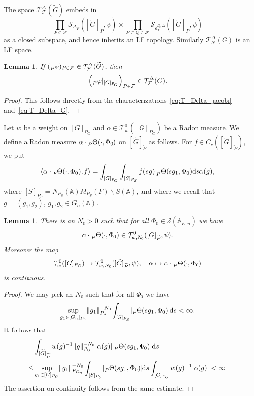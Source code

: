 \documentclass[letterpaper,11pt]{amsart}
\newcommand{\bA}{\mathbb{A}}
\newcommand{\cF}{\mathcal{F}}
\newcommand{\cS}{\mathcal{S}}
\newcommand{\cT}{\mathcal{T}}
\newcommand{\rd}{\mathrm{d}}
\newcommand{\<}{\negthickspace}
\providecommand{\abs}[1]{\lvert#1\rvert}
\providecommand{\aabs}[1]{\lVert#1\rVert}
\theoremstyle{definition}
\theoremstyle{plain}
\newtheorem{lemma}[definition]{Lemma}
\theoremstyle{remark}
\numberwithin{equation}{section}
\begin{document}
The space $\cT_{\cF}^{\Delta}(\widetilde{G})$
embeds in
    \[
    \prod_{P \in \cF}
    \cS_{\Delta_P}([\widetilde{G}]_{\widetilde{P}},\psi)
    \times \prod_{P \subset Q \in \cF}
    \cS_{d_P^{Q,\Delta}} ([\widetilde{G}]_{\widetilde{P}},\psi)
    \]
as a closed subspace, and hence inherits an LF topology. Similarly $\cT_{\cF}^{\Delta}(G)$
is an LF space.


\begin{lemma}   \label{lemma:restriction_space_T}
If $(\prescript{}{P}{\varphi})_{P \in \cF} \in
\cT_{\cF}^{\Delta}(\widetilde{G})$, then
    \[
    \left(\prescript{}{P}{\varphi}|_{[G]_{P_G}}\right)_{P \in \cF}
    \in \cT_{\cF}^{\Delta}(G).
    \]
\end{lemma}

\begin{proof}
This follows directly from the characterizations~\eqref{eq:T_Delta_jacobi}
and~\eqref{eq:T_Delta_G}.
\end{proof}


Let $w$ be a weight on $[G]_{P_G}$ and $\alpha \in \cT_{w}^0([G]_{P_G})$ be a Radon measure. We define a Radon measure $\alpha \cdot \prescript{}{P}{\Theta}(\cdot, \Phi_0)$ on $[\widetilde{G}]_{\widetilde{P}}$  as follows. For $f \in C_c([\widetilde{G}]_{\widetilde{P}})$, we put
\begin{equation}
\label{eq:Radon_defi}
     \langle \alpha\cdot \prescript{}{P}{\Theta}(\cdot, \Phi_0), f \rangle =
    \int_{[G]_{P_G}} \int_{[S]_{P_S}}
    f(sg) \prescript{}{P}{\Theta(sg_1, \Phi_0)} \rd s
    \alpha(g),
\end{equation}
where $[S]_{P_S} = N_{P_S}(\bA) M_{P_S}(F) \backslash S(\bA)$, and where we recall that $g = (g_1, g_2)$, $g_1, g_2 \in G_n(\bA)$.

\begin{lemma}   \label{lemma:distribution_extension_by_theta}
There is an $N_0>0$ such that for all $\Phi_0 \in \cS(\bA_{E, n})$ we have
    \[
    \alpha
    \cdot \prescript{}{P}{\Theta(\cdot, \Phi_0)} \in \cT_{w,
    N_0}^0([\widetilde{G}]_{\widetilde{P}}, \psi).
    \]
Moreover the map
    \[
    \cT^0_{w}([G]_{P_G}) \to \cT_{w,
    N_0}^0([\widetilde{G}]_{\widetilde{P}}, \psi), \quad
    \alpha \mapsto \alpha
    \cdot \prescript{}{P}{\Theta(\cdot, \Phi_0)}
    \]
is continuous.
\end{lemma}

\begin{proof}
We may pick an $N_0$ such that for all $\Phi_0$ we have
    \[
    \sup_{g_1 \in [G_n]_{P_{n}}} \aabs{g_1}_{P_n}^{-N_0}
    \int_{[S]_{P_S}} \abs{\prescript{}{P}{\Theta}(sg_1, \Phi_0)} \rd s
    < \infty.
    \]
It follows that
    \[
    \begin{aligned}
    &\int_{[\widetilde{G}]_{\widetilde{P}}}
    w(g)^{-1} \aabs{g}_{P_G}^{-N_0}
    \abs{\alpha(g)}
    \abs{\prescript{}{P}{\Theta}(sg_1, \Phi_0)} \rd s\\
     \leq
    &\sup_{g_1 \in [G]_{P_G}} \aabs{g_1}_{P_{G_n}}^{-N_0}
    \int_{[S]_{P_S}} \abs{\prescript{}{P}{\Theta}(s g_1, \Phi_0)} \rd s
    \int_{[G]_{P_G}} w(g)^{-1} \abs{\alpha(g)} < \infty.
    \end{aligned}
    \]
The assertion on continuity follows from the same estimate.
\end{proof}
\end{document}
